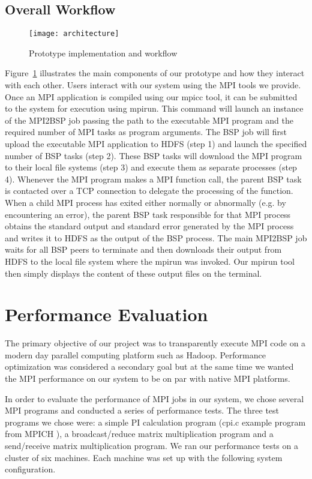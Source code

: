 \documentclass[conference,10pt] {IEEEtran}
\begin{document}
\subsection{Overall Workflow}
\begin{figure}
\centering
\texttt{[image: architecture]}
\caption{Prototype implementation and workflow}
\label{fig:architecture}
\end{figure}
Figure~\ref{fig:architecture} illustrates the main components of our prototype and how they interact with each other. Users interact with our system using the MPI tools we provide. Once an MPI application is compiled using our mpicc tool, it can be submitted to the system for execution using mpirun. This command will launch an instance of the MPI2BSP job passing the path to the executable MPI program and the required number of MPI tasks as program arguments. The BSP job will first upload the executable MPI application to HDFS (step 1) and launch the specified number of BSP tasks (step 2). These BSP tasks will download the MPI program to their local file systems (step 3) and execute them as separate processes (step 4). Whenever the MPI program makes a MPI function call, the parent BSP task is contacted over a TCP connection to delegate the processing of the function. When a child MPI process has exited either normally or abnormally (e.g. by encountering an error), the parent BSP task responsible for that MPI process obtains the standard output and standard error generated by the MPI process and writes it to HDFS as the output of the BSP process. The main MPI2BSP job waits for all BSP peers to terminate and then downloads their output from HDFS to the local file system where the mpirun was invoked. Our mpirun tool then simply displays the content of these output files on the terminal.

\section{Performance Evaluation}
\label{sec:performance_eval}

The primary objective of our project was to transparently execute MPI code on a modern day parallel computing platform such as Hadoop. Performance optimization was considered a secondary goal but at the same time we wanted the MPI performance on our system to be on par with native MPI platforms. 

In order to evaluate the performance of MPI jobs in our system, we chose several MPI programs and conducted a series of performance tests. The three test programs we chose were: a simple PI calculation program (cpi.c example program from MPICH \cite{url:mpich}), a broadcast/reduce matrix multiplication program and a send/receive matrix multiplication program. We ran our performance tests on a cluster of six machines. Each machine was set up with the following system configuration.
\end{document}

